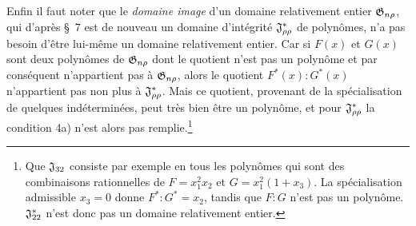 Enfin il faut noter que le \emph{domaine image} d'un domaine relativement entier $\mathfrak{G}_{n\rho}$, qui d'après \S\ 7 est de nouveau un domaine d’intégrité $\mathfrak{J}^*_{\rho\rho}$ de polynômes, n'a pas besoin d'être lui-même un domaine relativement entier. Car si $F(x)$ et $G(x)$ sont deux polynômes de $\mathfrak{G}_{n\rho}$ dont le quotient n'est pas un polynôme et par conséquent n'appartient pas à $\mathfrak{G}_{n\rho}$, alors le quotient $F^*(x):G^*(x)$ n'appartient pas non plus à $\mathfrak{J}^*_{\rho\rho}$. Mais ce quotient, provenant de la spécialisation de quelques indéterminées, peut très bien être un polynôme, et pour $\mathfrak{J}^*_{\rho\rho}$ la condition 4a) n'est alors pas remplie.\footnote{Que $\mathfrak{J}_{32}$ consiste par exemple en tous les polynômes qui sont des combinaisons rationnelles de $F=x_1^2x_2$ et $G=x_1^2(1+x_3)$. La spécialisation admissible $x_3=0$ donne $F^*:G^*=x_2$, tandis que $F:G$ n'est pas un polynôme. $\mathfrak{J}^*_{22}$ n'est donc pas un domaine relativement entier.}
